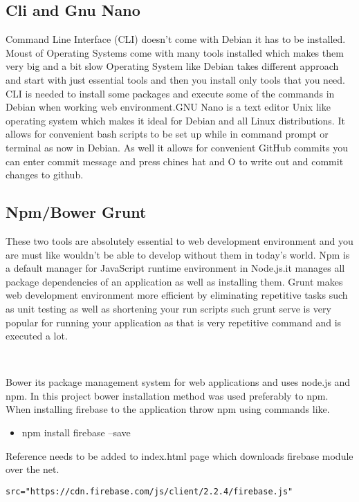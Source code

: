 \subsection{Cli and Gnu Nano}
\bigbreak
Command Line Interface (CLI) doesn’t come with Debian it has to be installed. Moust of Operating Systems come with many tools installed which makes them very big and a bit slow Operating System like Debian takes different approach and start with just essential tools and then you install only tools that you need. CLI is needed to install some packages and execute some of the commands in Debian when working web environment.GNU Nano is a text editor Unix like operating system which makes it ideal for Debian and all Linux distributions. It allows for convenient bash scripts to be set up while in command prompt or terminal as now in Debian. As well it allows for convenient GitHub commits you can enter commit message and press chines hat and O to write out and commit changes to github.


\subsection{Npm/Bower Grunt}
\bigbreak
These two tools are absolutely essential to web development environment and you are must like wouldn’t be able to develop without them in today’s world. Npm is a default manager for JavaScript runtime environment in Node.js.it manages all package dependencies of an application as well as installing them. Grunt makes web development environment more efficient by eliminating repetitive tasks such as unit testing as well as shortening your run scripts such grunt serve is very popular for running your application as that is very repetitive command and is executed a lot.

\\
\bigbreak

Bower its package management system for web applications and uses node.js and npm.
In this project bower installation method was used preferably to npm. When installing firebase to the application throw npm using commands like.

\begin{itemize}
	\item npm install firebase –save
\end{itemize}
Reference needs to be added to index.html page which downloads firebase module over the net.


\begin{verbatim}
src="https://cdn.firebase.com/js/client/2.2.4/firebase.js"
\end{verbatim}




